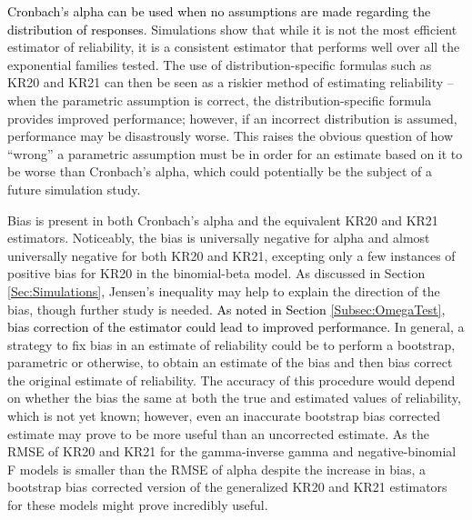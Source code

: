\documentclass[12pt,epsfig]{article}
\newcommand{\changed}[1]{\textcolor{black}{#1}}
\begin{document}
\changed{Cronbach's alpha can be used when no assumptions are made regarding the distribution of responses}. Simulations show that while it is not the most efficient estimator of reliability, it is a consistent estimator that performs well over all the exponential families tested. The use of distribution-specific formulas such as KR20 and KR21 can then be seen as a riskier method of estimating reliability -- when the parametric assumption is correct, the distribution-specific formula provides improved performance; however, if an incorrect distribution is assumed, performance may be disastrously worse. This raises the obvious question of how ``wrong'' a parametric assumption must be in order for an estimate based on it to be worse than Cronbach's alpha, which could potentially be the subject of a future simulation study. %

Bias is present in both Cronbach's alpha and the equivalent KR20 and KR21 estimators. Noticeably, the bias is universally negative for alpha and almost universally negative for both KR20 and KR21, excepting only a few instances of positive bias for KR20 in the binomial-beta model. As discussed in Section \ref{Sec:Simulations}, Jensen's inequality may help to explain the direction of the bias, though further study is needed. \changed{As noted in Section \ref{Subsec:OmegaTest}, bias correction of the estimator could lead to improved performance.} In general, a strategy to fix bias in an estimate of reliability could be to perform a bootstrap, parametric or otherwise, to obtain an estimate of the bias and then bias correct the original estimate of reliability. The accuracy of this procedure would depend on whether the bias the same at both the true and estimated values of reliability, which is not yet known; however, even an inaccurate bootstrap bias corrected estimate may prove to be more useful than an uncorrected estimate. As the RMSE of KR20 and KR21 for the gamma-inverse gamma and negative-binomial F models is smaller than the RMSE of alpha despite the increase in bias, a bootstrap bias corrected version of the generalized KR20 and KR21 estimators for these models might prove incredibly useful.
\end{document}
